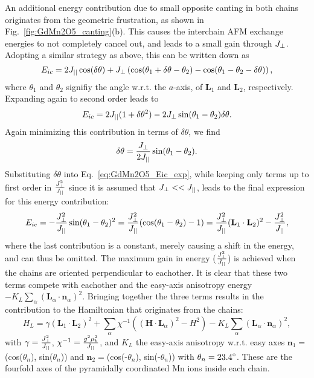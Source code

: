 An additional energy contribution due to small opposite canting in both chains originates from the geometric frustration, as shown in Fig.~\ref{fig:GdMn2O5_canting}(b). This causes the interchain AFM exchange energies to not completely cancel out, and leads to a small gain through $J_{\perp}$.
Adopting a similar strategy as above, this can be written down as
\begin{equation}
	E_{ic} = 2 J_{||} \cos(\delta \theta) + J_{\perp} \left(\cos(\theta_1 + \delta \theta - \theta_2) - \cos(\theta_1 - \theta_2 -\delta \theta)\right),
\end{equation}
where $\theta_1$ and $\theta_2$ signifiy the angle w.r.t. the $a$-axis, of $\mathbf{L}_1$ and $\mathbf{L}_2$, respectively.
Expanding again to second order leads to
\begin{equation}
	E_{ic} = 2 J_{||} ( 1+ \delta \theta^2) - 2 J_{\perp} \sin(\theta_1 - \theta_2)\delta \theta. \label{eq:GdMn2O5_Eic_exp}
\end{equation}
Again minimizing this contribution in terms of $\delta \theta$, we find
\begin{equation}
	\delta \theta = \frac{J_{\perp}}{2 J_{||}} \sin(\theta_1 - \theta_2).
\end{equation}
Substituting $\delta \theta$ into Eq.~\ref{eq:GdMn2O5_Eic_exp}, while keeping only terms up to first order in $\frac{J_{\perp}^2}{J_{||}}$ since it is assumed that $J_{\perp} << J_{||}$, leads to the final expression for this energy contribution:
\begin{equation}
	E_{ic} = -\frac{J_{\perp}^2}{J_{||}}\sin(\theta_1 - \theta_2)^2 =  \frac{J_{\perp}^2}{J_{||}}(\cos(\theta_1 - \theta_2) - 1) = \frac{J_{\perp}^2}{J_{||}}(\mathbf{L}_1 \cdot \mathbf{L}_2)^2 - \frac{J_{\perp}^2}{J_{||}},
\end{equation}
where the last contribution is a constant, merely causing a shift in the energy, and can thus be omitted.
The maximum gain in energy ($\frac{J_{\perp}^2}{J_{||}}$) is achieved when the chains are oriented perpendicular to eachother.
It is clear that these two terms compete with eachother and the easy-axis anisotropy energy $-K_L\sum_\alpha(\mathbf{L}_\alpha\cdot \mathbf{n}_\alpha)^2$.
Bringing together the three terms results in the contribution to the Hamiltonian that originates from the chains:
\begin{equation}
	H_L = \gamma(\mathbf{L}_1\cdot \mathbf{L}_2)^2
    +\sum_{\alpha}\chi^{-1}((\mathbf{H}\cdot \mathbf{L}_\alpha)^2-H^2)
    -K_L\sum_\alpha(\mathbf{L}_\alpha\cdot \mathbf{n}_\alpha)^2\label{eq:GdMn2O5_hami_1},
\end{equation}
with $\gamma = \frac{J_{\perp}^2}{J_{||}}$, $\chi^{-1} = \frac{g^2\mu_b^2}{J_{||}}$, and $K_L$ the easy-axis anisotropy w.r.t. easy axes $\mathbf{n}_1=$(cos($\theta_n$), sin($\theta_n$)) and $\mathbf{n}_2=$(cos(-$\theta_n$), sin(-$\theta_n$)) with $\theta_n = \rm{23.4}^\circ$. These are the fourfold axes of the pyramidally coordinated Mn ions inside each chain.

